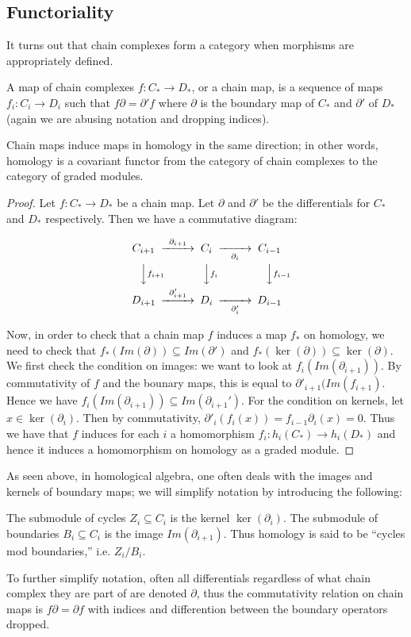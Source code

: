 \subsection{Functoriality}
It turns out that chain complexes form a category when morphisms are appropriately defined.
\begin{definition} A map of chain complexes $f:C_*\rightarrow D_*$, or a chain map, is a sequence of maps $f_i:C_i\rightarrow D_i$ such that $f\partial = \partial' f$ where $\partial$ is the boundary map of $C_*$ and $\partial'$ of $D_*$ (again we are abusing notation and dropping indices). \end{definition}
\begin{theorem} Chain maps induce maps in homology in the same direction; in other words, homology is a covariant functor from the category of chain complexes to the category of graded modules.\end{theorem}
\begin{proof}
Let $f:C_*\rightarrow D_*$ be a chain map. Let $\partial$ and $\partial'$ be the differentials for $C_*$ and $D_*$ respectively. Then we have a commutative diagram:

\begin{equation}
\begin{CD}
C_{i+1} @>\partial_{i+1}>> C_i @>>\partial_i> C_{i-1}\\
@VV f_{i+1} V          @VV f_i V             @VVf_{i-1} V\\
D_{i+1} @>\partial'_{i+1}>> D_i @>>\partial'_i> D_{i-1}
\end{CD}
\end{equation}

Now, in order to check that a chain map $f$ induces a map $f_*$ on homology, we need to check that $f_*(Im(\partial))\subseteq Im(\partial')$ and $f_*(\ker(\partial))\subseteq \ker(\partial)$. We first check the condition on images: we want to look at $f_i(Im(\partial_{i+1}))$. By commutativity of $f$ and the bounary maps, this is equal to $\partial'_{i+1}(Im(f_{i+1})$. Hence we have $f_i(Im(\partial_{i+1}))\subseteq Im(\partial_{i+1}')$. For the condition on kernels, let $x\in \ker(\partial_i)$. Then by commutativity, $\partial'_i(f_i(x))=f_{i-1}\partial_i(x)=0$. Thus we have that $f$ induces for each $i$ a homomorphism $f_i:h_i(C_*)\rightarrow h_i(D_*)$ and hence it induces a homomorphism on homology as a graded module. \end{proof}

As seen above, in homological algebra, one often deals with the images and kernels of boundary maps; we will simplify notation by introducing the following:
\begin{definition} The submodule of cycles $Z_i\subseteq C_i$ is the kernel $\ker(\partial_i)$. The submodule of boundaries $B_i\subseteq C_i$ is the image $Im(\partial_{i+1})$. Thus homology is said to be ``cycles mod boundaries,'' i.e. $Z_i/B_i$.\end{definition}
To further simplify notation, often all differentials regardless of what chain complex they are part of are denoted $\partial$, thus the commutativity relation on chain maps is $f\partial=\partial f$ with indices and differention between the boundary operators dropped. 

